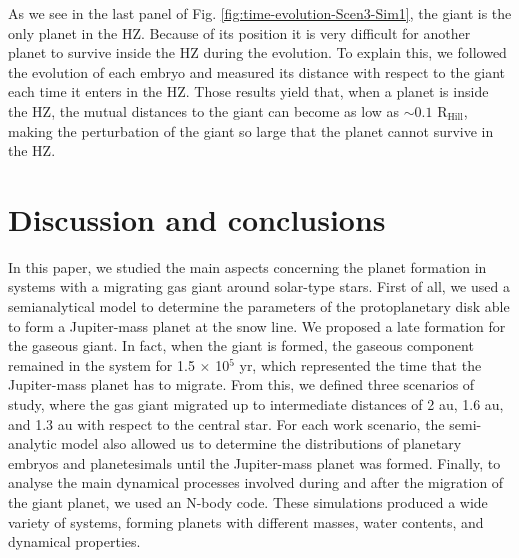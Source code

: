 \documentclass{aa}
\begin{document}
As we see in the last panel of Fig. \ref{fig:time-evolution-Scen3-Sim1}, the giant is the only planet in the HZ. Because of its position
it is very difficult for another planet to survive inside the HZ during the evolution. To explain this, we followed the evolution of each
embryo and measured its distance with respect to the giant each time it enters in the HZ. Those results yield that, when a planet is
inside the HZ, the mutual distances to the giant can become as low as $\sim 0.1$ R$_{\text{Hill}}$, making the perturbation of the giant so large
that the planet cannot survive in the HZ.

\section{Discussion and conclusions}

In this paper, we studied the main aspects concerning the planet formation in systems with a migrating gas giant around solar-type stars.
First of all, we used a semianalytical model to determine the parameters of the protoplanetary disk able to form a Jupiter-mass
planet at the snow line. We proposed a late formation for the gaseous giant. In fact, when the giant is formed, the gaseous component
remained in the system for 1.5 $\times$ 10$^{5}$ yr, which represented the time that the Jupiter-mass planet has to migrate. From this,
we defined three scenarios of study, where the gas giant migrated up to intermediate distances of 2 au, 1.6 au, and 1.3 au with respect
to the central star. 
For each work scenario, the semi-analytic model also allowed us to determine the distributions of planetary embryos and planetesimals
until the Jupiter-mass planet was formed.
Finally, to analyse the main dynamical processes involved during and after the migration of the giant planet, we used
an N-body code. These simulations produced a wide variety of systems, forming planets with different masses, water contents,
and dynamical properties.
\end{document}
